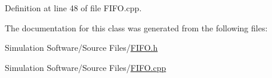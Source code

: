 Definition at line 48 of file F\+I\+F\+O.\+cpp.



The documentation for this class was generated from the following files\+:\begin{DoxyCompactItemize}
\item 
Simulation Software/\+Source Files/\hyperlink{_f_i_f_o_8h}{F\+I\+F\+O.\+h}\item 
Simulation Software/\+Source Files/\hyperlink{_f_i_f_o_8cpp}{F\+I\+F\+O.\+cpp}\end{DoxyCompactItemize}
